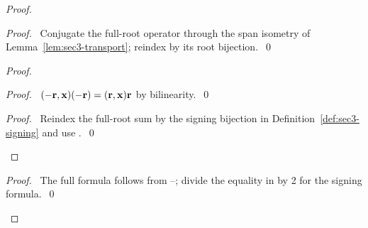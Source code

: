 \begin{proof}
 \begin{proof}\pf\ Conjugate the full-root operator through the span isometry
  of Lemma~\ref{lem:sec3-transport}; reindex by its root bijection.~\qed\end{proof}
 \begin{proof}
  \begin{proof}\pf\ $(-{\mathbf r},{\mathbf x})(-{\mathbf r})=({\mathbf r},{\mathbf x}){\mathbf r}$ by bilinearity.~\qed\end{proof}
  \qedstep
  \begin{proof}\pf\ Reindex the full-root sum by the signing bijection in
   Definition~\ref{def:sec3-signing} and use .~\qed\end{proof}
 \end{proof}
 \qedstep
 \begin{proof}\pf\ The full formula follows from --;
  divide the equality in  by 2 for the signing formula.~\qed\end{proof}
\end{proof}

